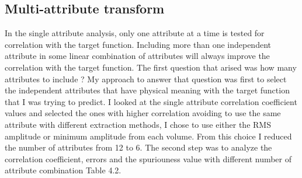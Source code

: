 \subsection{Multi-attribute transform}


In the single attribute analysis, only one attribute at a time is tested for correlation with the target function. Including more than one independent attribute in some linear combination of attributes will always improve the correlation with the target function. The first question that arised was how many attributes to include ? My approach to answer that question was first to select the independent attributes that have physical meaning with the target function that I was trying to predict. I looked at the single attribute correlation coefficient values and selected the ones with higher correlation avoiding to use the same attribute with different extraction methods, I chose to use either the RMS amplitude or minimum amplitude from each volume. From this choice I reduced the number of attributes from 12 to 6. The second step was to analyze the correlation coefficient, errors  and the spuriouness value with different number of attribute combination  Table 4.2.



